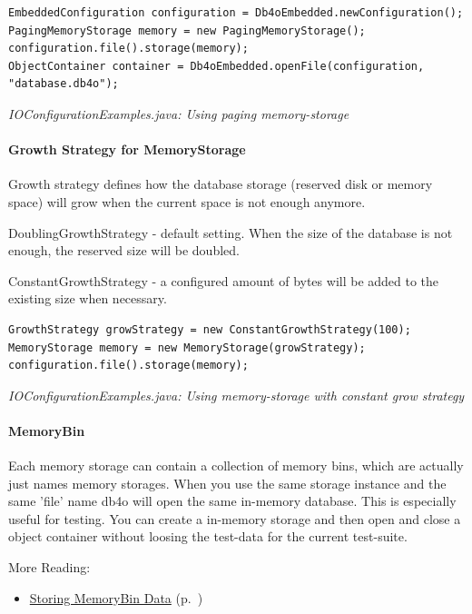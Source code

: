 \begin{lstlisting}
EmbeddedConfiguration configuration = Db4oEmbedded.newConfiguration();
PagingMemoryStorage memory = new PagingMemoryStorage();
configuration.file().storage(memory);
ObjectContainer container = Db4oEmbedded.openFile(configuration, "database.db4o");
\end{lstlisting}

{\small\itshape IOConfigurationExamples.java: Using paging memory-storage\par}
\medskip

\paragraph*{Growth Strategy for MemoryStorage}

Growth strategy defines how the database storage (reserved disk or memory space) will grow when the current space is not enough anymore.

DoublingGrowthStrategy - default setting. When the size of the database is not enough, the reserved size will be doubled.

ConstantGrowthStrategy - a configured amount of bytes will be added to the existing size when necessary.

\begin{lstlisting}
GrowthStrategy growStrategy = new ConstantGrowthStrategy(100);
MemoryStorage memory = new MemoryStorage(growStrategy);
configuration.file().storage(memory);
\end{lstlisting}

{\small\itshape IOConfigurationExamples.java: Using memory-storage with constant grow strategy\par}
\medskip

\paragraph*{MemoryBin}

Each memory storage can contain a collection of memory bins, which are actually just names memory storages. When you use the same storage instance and the same 'file' name db4o will open the same in-memory database. This is especially useful for testing. You can create a in-memory storage and then open and close a object container without loosing the test-data for the current test-suite.

More Reading:

\begin{itemize}
\item \hyperref[ref:configuration-file-storage-memory-storage-storing-memorybin-data]{Storing MemoryBin Data} (p.~\pageref{ref:configuration-file-storage-memory-storage-storing-memorybin-data})
\end{itemize}

